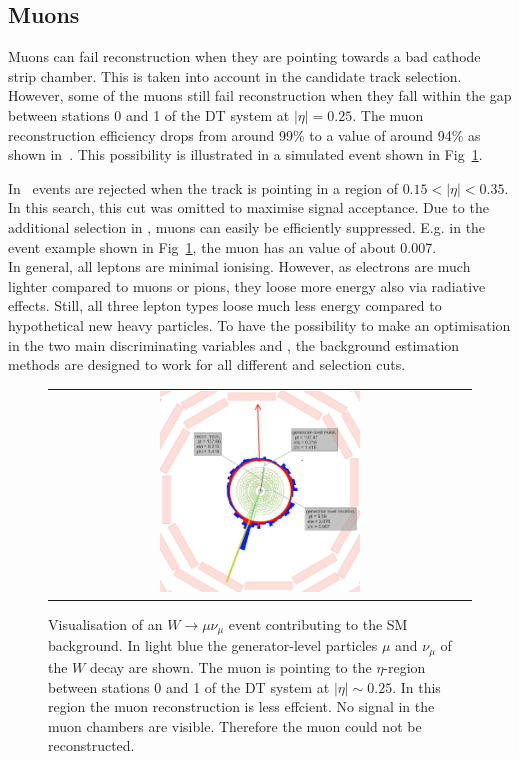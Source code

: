 \subsection*{Muons}
Muons can fail reconstruction when they are pointing towards a bad cathode strip chamber.
This is taken into account in the candidate track selection.
However, some of the muons still fail reconstruction when they fall within the gap between stations 0 and 1 of the DT system at $|\eta|=0.25$.
The muon reconstruction efficiency drops from around 99\% to a value of around 94\% as shown in~\cite{bib:CMS:DT_Thesis,bib:CMS:DT_8TeV_AN}.
This possibility is illustrated in a simulated event shown in Fig~\ref{fig:LostMuon}.


In~\cite{bib:CMS:DT_Thesis,bib:CMS:DT_8TeV_AN} events are rejected when the track is pointing in a region of $0.15<|\eta|<0.35$.
In this search, this cut was omitted to maximise signal acceptance. 
Due to the additional selection in \ias, muons can easily be efficiently suppressed.
E.g. in the event example shown in Fig~\ref{fig:LostMuon}, the muon has an \ias value of about 0.007.\\


In general, all leptons are minimal ionising.
However, as electrons are much lighter compared to muons or pions, they loose more energy also via radiative effects.
Still, all three lepton types loose much less energy compared to hypothetical new heavy particles.
To have the possibility to make an optimisation in the two main discriminating variables \pt and \ias, the background estimation methods are designed to work for all different \pt and \ias selection cuts.
\begin{figure}[!tb]
  \centering 
  \begin{tabular}{c}
    \includegraphics[width=0.49\textwidth]{figures/analysis/Background/LostMuon_Lumi_456307_event_182377157.png}
  \end{tabular}
  \caption{Visualisation of an $W\rightarrow \mu\nu_{\mu}$ event contributing to the SM background. 
           In light blue the generator-level particles $\mu$ and $\nu_{\mu}$ of the $W$ decay are shown. 
           The muon is pointing to the $\eta$-region between stations 0 and 1 of the DT system at $|\eta|\sim0.25$.
           In this region the muon reconstruction is less effcient. No signal in the muon chambers are visible. Therefore the  muon could not be reconstructed.}
  \label{fig:LostMuon}
\end{figure}

